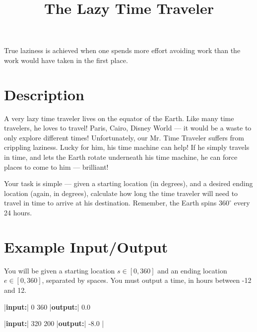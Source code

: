 \documentclass{../codeproblem}
\begin{document}
\title{The Lazy Time Traveler}

\begin{flavor}
  True laziness is achieved when one spends more effort avoiding work
  than the work would have taken in the first place.
\end{flavor}

\section*{Description}
A very lazy time traveler lives on the equator of the Earth. Like many
time travelers, he loves to travel! Paris, Cairo, Disney World --- it
would be a waste to only explore different times! Unfortunately,
our Mr. Time Traveler suffers from crippling laziness. Lucky for him, his
time machine can help! If he simply travels in time, and lets the
Earth rotate underneath his time machine, he can force places to come
to him --- brilliant!

Your task is simple --- given a starting location (in degrees), and a
desired ending location (again, in degrees), calculate how long the
time traveler will need to travel in time to arrive at his
destination. Remember, the Earth spins $360^\circ$ every 24 hours.

\section*{Example Input/Output}

You will be given a starting location $s \in [0, 360]$ and an ending
location $e \in [0, 360]$, separated by spaces. You must
output a time, in hours between -12 and 12.

\begin{example}
|\textbf{input:}| 0 360
|\textbf{output:}| 0.0

|\textbf{input:}| 320 200
|\textbf{output:}| -8.0
|\end{example}
\end{document}
